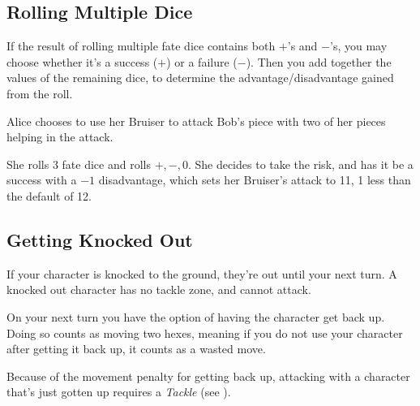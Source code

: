 \subsection{Rolling Multiple Dice}\label{sec:multidice} If the result of rolling multiple fate dice contains both $+$'s and $-$'s, you may choose whether it's a success ($+$) or a failure ($-$).
Then you add together the values of the remaining dice, to determine the advantage/disadvantage gained from the roll.

\begin{example}
    Alice chooses to use her Bruiser to attack Bob's piece with two of her pieces helping in the attack.
\end{example}
She rolls 3 fate dice and rolls $+, -, 0$.
She decides to take the risk, and has it be a success with a $-1$ disadvantage, which sets her Bruiser's attack to 11, 1 less than the default of 12.

\subsection{Getting Knocked Out}\label{sec:knockout}
If your character is knocked to the ground, they're out until your next turn.
A knocked out character has no tackle zone, and cannot attack.

On your next turn you have the option of having the character get back up.
Doing so counts as moving two hexes, meaning if you do not use your character after getting it back up, it counts as a wasted move.

\begin{note} 
Because of the movement penalty for getting back up, attacking with a character that's just gotten up requires a \textit{Tackle} (see ).
\end{note}